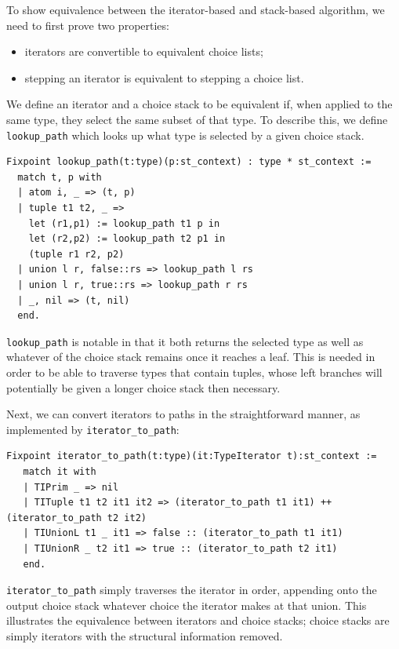 \documentclass[a4paper,english]{lipics-v2019}
\begin{document}
To show equivalence between the iterator-based and stack-based algorithm, we need to
first prove two properties:

\begin{itemize}
  \item iterators are convertible to equivalent choice lists;
  \item stepping an iterator is equivalent to stepping a choice list.
\end{itemize}

We define an iterator and a choice stack to be equivalent if, when applied to
the same type, they select the same subset of that type. To describe this, we
define \verb|lookup_path| which looks up what type is selected by a given
choice stack.

\begin{small}\begin{verbatim}
Fixpoint lookup_path(t:type)(p:st_context) : type * st_context :=
  match t, p with
  | atom i, _ => (t, p)
  | tuple t1 t2, _ =>
    let (r1,p1) := lookup_path t1 p in
    let (r2,p2) := lookup_path t2 p1 in
    (tuple r1 r2, p2)
  | union l r, false::rs => lookup_path l rs
  | union l r, true::rs => lookup_path r rs
  | _, nil => (t, nil)
  end.
\end{verbatim}\end{small}

\verb|lookup_path| is notable in that it both returns the selected type as
well as whatever of the choice stack remains once it reaches a leaf. This is
needed in order to be able to traverse types that contain tuples,  whose left
branches will potentially be given a longer choice stack then necessary.

Next, we can convert iterators to paths in the straightforward manner, as
implemented by \verb|iterator_to_path|:

\begin{small}\begin{verbatim}
Fixpoint iterator_to_path(t:type)(it:TypeIterator t):st_context :=
   match it with
   | TIPrim _ => nil
   | TITuple t1 t2 it1 it2 => (iterator_to_path t1 it1) ++ (iterator_to_path t2 it2)
   | TIUnionL t1 _ it1 => false :: (iterator_to_path t1 it1)
   | TIUnionR _ t2 it1 => true :: (iterator_to_path t2 it1)
   end.
\end{verbatim}\end{small}

\verb|iterator_to_path| simply traverses the iterator in order, appending onto the
output choice stack whatever choice the iterator makes at that union. This illustrates
the equivalence between iterators and choice stacks; choice stacks are simply iterators
with the structural information removed.
\end{document}
